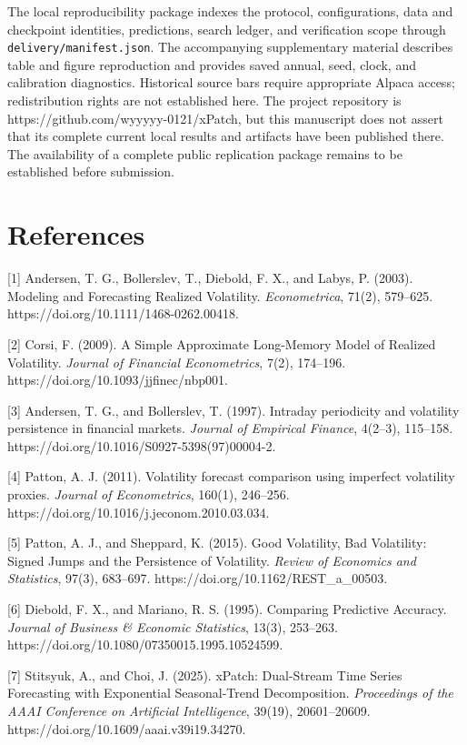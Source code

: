 The local reproducibility package indexes the protocol, configurations,
data and checkpoint identities, predictions, search ledger, and
verification scope through \texttt{delivery/manifest.json}. The
accompanying supplementary material describes table and figure
reproduction and provides saved annual, seed, clock, and calibration
diagnostics. Historical source bars require appropriate Alpaca access;
redistribution rights are not established here. The project repository
is https://github.com/wyyyyy-0121/xPatch, but this manuscript does not
assert that its complete current local results and artifacts have been
published there. The availability of a complete public replication
package remains to be established before submission.

\section*{References}
\begingroup\small

{[}1{]} Andersen, T. G., Bollerslev, T., Diebold, F. X., and Labys, P.
(2003). Modeling and Forecasting Realized Volatility.
\emph{Econometrica}, 71(2), 579--625.
https://doi.org/10.1111/1468-0262.00418.

{[}2{]} Corsi, F. (2009). A Simple Approximate Long-Memory Model of
Realized Volatility. \emph{Journal of Financial Econometrics}, 7(2),
174--196. https://doi.org/10.1093/jjfinec/nbp001.

{[}3{]} Andersen, T. G., and Bollerslev, T. (1997). Intraday periodicity
and volatility persistence in financial markets. \emph{Journal of
Empirical Finance}, 4(2--3), 115--158.
https://doi.org/10.1016/S0927-5398(97)00004-2.

{[}4{]} Patton, A. J. (2011). Volatility forecast comparison using
imperfect volatility proxies. \emph{Journal of Econometrics}, 160(1),
246--256. https://doi.org/10.1016/j.jeconom.2010.03.034.

{[}5{]} Patton, A. J., and Sheppard, K. (2015). Good Volatility, Bad
Volatility: Signed Jumps and the Persistence of Volatility. \emph{Review
of Economics and Statistics}, 97(3), 683--697.
https://doi.org/10.1162/REST\_a\_00503.

{[}6{]} Diebold, F. X., and Mariano, R. S. (1995). Comparing Predictive
Accuracy. \emph{Journal of Business \& Economic Statistics}, 13(3),
253--263. https://doi.org/10.1080/07350015.1995.10524599.

{[}7{]} Stitsyuk, A., and Choi, J. (2025). xPatch: Dual-Stream Time
Series Forecasting with Exponential Seasonal-Trend Decomposition.
\emph{Proceedings of the AAAI Conference on Artificial Intelligence},
39(19), 20601--20609. https://doi.org/10.1609/aaai.v39i19.34270.

